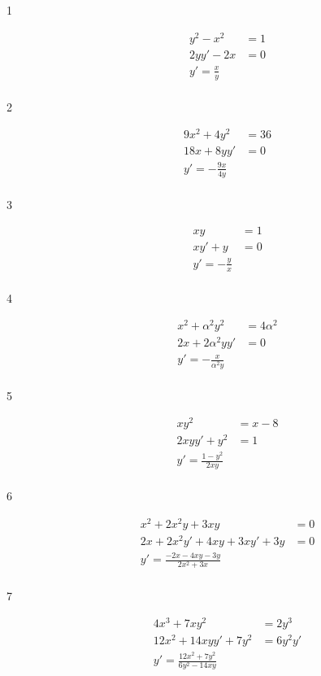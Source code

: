 \documentclass{exam}
\begin{document}
\begin{description}
\item[1]
\begin{align*}
  y^2 - x^2 &= 1 \\
  2yy' - 2x &= 0 \\
  y' = \frac{x}{y} \\
\end{align*}

\item[2]
\begin{align*}
  9x^2 + 4y^2 &= 36 \\
  18x + 8yy' &= 0 \\
  y' = - \frac{9x}{4y} \\
\end{align*}

\item[3]
\begin{align*}
  xy &= 1 \\
  xy' + y &= 0 \\
  y' = - \frac{y}{x} \\
\end{align*}

\item[4]
\begin{align*}
  x^2 + \alpha^2 y^2 &= 4 \alpha^2 \\
  2x + 2 \alpha^2 yy' &= 0 \\
  y' = - \frac{x}{\alpha^2 y} \\
\end{align*}

\item[5]
\begin{align*}
  xy^2 &= x - 8 \\
  2xyy' + y^2 &= 1 \\
  y' = \frac{1 - y^2}{2xy} \\
\end{align*}

\item[6]
\begin{align*}
  x^2 + 2x^2y + 3xy &= 0 \\
  2x + 2x^2y' + 4xy + 3xy' + 3y &= 0 \\
  y' = \frac{-2x - 4xy - 3y}{2x^2 + 3x} \\
\end{align*}

\item[7]
\begin{align*}
  4x^3 + 7xy^2 &= 2y^3 \\
  12x^2 + 14xyy' + 7y^2 &= 6y^2y' \\
  y' = \frac{12x^2 + 7y^2}{6y^2 - 14xy} \\
\end{align*}


\end{description}
\end{document}
